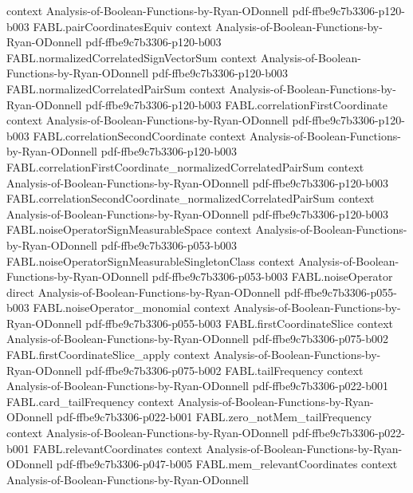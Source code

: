 \begin{theorem}
  {context}
  {Analysis-of-Boolean-Functions-by-Ryan-ODonnell}
  {pdf-ffbe9c7b3306-p120-b003}
\proofstep
  {FABL.pairCoordinatesEquiv}
  {context}
  {Analysis-of-Boolean-Functions-by-Ryan-ODonnell}
  {pdf-ffbe9c7b3306-p120-b003}
\proofstep
  {FABL.normalizedCorrelatedSignVectorSum}
  {context}
  {Analysis-of-Boolean-Functions-by-Ryan-ODonnell}
  {pdf-ffbe9c7b3306-p120-b003}
\proofstep
  {FABL.normalizedCorrelatedPairSum}
  {context}
  {Analysis-of-Boolean-Functions-by-Ryan-ODonnell}
  {pdf-ffbe9c7b3306-p120-b003}
\proofstep
  {FABL.correlationFirstCoordinate}
  {context}
  {Analysis-of-Boolean-Functions-by-Ryan-ODonnell}
  {pdf-ffbe9c7b3306-p120-b003}
\proofstep
  {FABL.correlationSecondCoordinate}
  {context}
  {Analysis-of-Boolean-Functions-by-Ryan-ODonnell}
  {pdf-ffbe9c7b3306-p120-b003}
\proofstep
  {FABL.correlationFirstCoordinate_normalizedCorrelatedPairSum}
  {context}
  {Analysis-of-Boolean-Functions-by-Ryan-ODonnell}
  {pdf-ffbe9c7b3306-p120-b003}
\proofstep
  {FABL.correlationSecondCoordinate_normalizedCorrelatedPairSum}
  {context}
  {Analysis-of-Boolean-Functions-by-Ryan-ODonnell}
  {pdf-ffbe9c7b3306-p120-b003}
\proofstep
  {FABL.noiseOperatorSignMeasurableSpace}
  {context}
  {Analysis-of-Boolean-Functions-by-Ryan-ODonnell}
  {pdf-ffbe9c7b3306-p053-b003}
\proofstep
  {FABL.noiseOperatorSignMeasurableSingletonClass}
  {context}
  {Analysis-of-Boolean-Functions-by-Ryan-ODonnell}
  {pdf-ffbe9c7b3306-p053-b003}
\proofstep
  {FABL.noiseOperator}
  {direct}
  {Analysis-of-Boolean-Functions-by-Ryan-ODonnell}
  {pdf-ffbe9c7b3306-p055-b003}
\proofstep
  {FABL.noiseOperator_monomial}
  {context}
  {Analysis-of-Boolean-Functions-by-Ryan-ODonnell}
  {pdf-ffbe9c7b3306-p055-b003}
\proofstep
  {FABL.firstCoordinateSlice}
  {context}
  {Analysis-of-Boolean-Functions-by-Ryan-ODonnell}
  {pdf-ffbe9c7b3306-p075-b002}
\proofstep
  {FABL.firstCoordinateSlice_apply}
  {context}
  {Analysis-of-Boolean-Functions-by-Ryan-ODonnell}
  {pdf-ffbe9c7b3306-p075-b002}
\proofstep
  {FABL.tailFrequency}
  {context}
  {Analysis-of-Boolean-Functions-by-Ryan-ODonnell}
  {pdf-ffbe9c7b3306-p022-b001}
\proofstep
  {FABL.card_tailFrequency}
  {context}
  {Analysis-of-Boolean-Functions-by-Ryan-ODonnell}
  {pdf-ffbe9c7b3306-p022-b001}
\proofstep
  {FABL.zero_notMem_tailFrequency}
  {context}
  {Analysis-of-Boolean-Functions-by-Ryan-ODonnell}
  {pdf-ffbe9c7b3306-p022-b001}
\proofstep
  {FABL.relevantCoordinates}
  {context}
  {Analysis-of-Boolean-Functions-by-Ryan-ODonnell}
  {pdf-ffbe9c7b3306-p047-b005}
\proofstep
  {FABL.mem_relevantCoordinates}
  {context}
  {Analysis-of-Boolean-Functions-by-Ryan-ODonnell}

\end{theorem}
